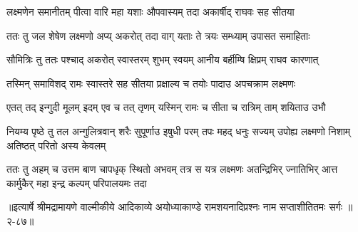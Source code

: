 \twolineshloka
{लक्ष्मणेन समानीतम् पीत्वा वारि महा यशाः}
{औपवास्यम् तदा अकार्षीद् राघवः सह सीतया} %

\twolineshloka
{ततः तु जल शेषेण लक्ष्मणो अप्य् अकरोत् तदा}
{वाग् यताः ते त्रयः सम्ध्याम् उपासत समाहिताः} %

\twolineshloka
{सौमित्रिः तु ततः पश्चाद् अकरोत् स्वास्तरम् शुभम्}
{स्वयम् आनीय बर्हीम्षि क्षिप्रम् राघव कारणात्} %

\twolineshloka
{तस्मिन् समाविशद् रामः स्वास्तरे सह सीतया}
{प्रक्षाल्य च तयोः पादाउ अपचक्राम लक्ष्मणः} %

\twolineshloka
{एतत् तद् इन्गुदी मूलम् इदम् एव च तत् तृणम्}
{यस्मिन् रामः च सीता च रात्रिम् ताम् शयिताउ उभौ} %

\fourlineindentedshloka
{नियम्य पृष्ठे तु तल अन्गुलित्रवान्}
{शरैः सुपूर्णाउ इषुधी परम् तपः}
{महद् धनुः सज्यम् उपोह्य लक्ष्मणो}
{निशाम् अतिष्ठत् परितो अस्य केवलम्} %

\fourlineindentedshloka
{ततः तु अहम् च उत्तम बाण चापधृक्}
{स्थितो अभवम् तत्र स यत्र लक्ष्मणः}
{अतन्द्रिभिर् ज्नातिभिर् आत्त कार्मुकैर्}
{महा इन्द्र कल्पम् परिपालयमः तदा} %


॥इत्यार्षे श्रीमद्रामायणे वाल्मीकीये आदिकाव्ये अयोध्याकाण्डे रामशयनादिप्रश्नः नाम सप्ताशीतितमः सर्गः ॥२-८७॥
